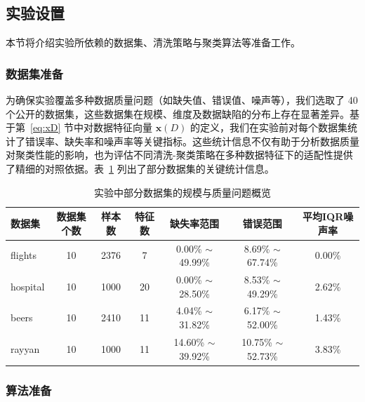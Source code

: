 \documentclass[10pt]{article} %
\numberwithin{equation}{section}
\begin{document}
\subsection{实验设置}
\label{sec:exp_setting}

本节将介绍实验所依赖的数据集、清洗策略与聚类算法等准备工作。

\subsubsection{数据集准备}
\label{sec:dataset_prep}

为确保实验覆盖多种数据质量问题（如缺失值、错误值、噪声等），我们选取了 40 个公开的数据集，这些数据集在规模、维度及数据缺陷的分布上存在显著差异。基于第~\ref{eq:xD} 节中对数据特征向量 $\mathbf{x}(D)$ 的定义，我们在实验前对每个数据集统计了错误率、缺失率和噪声率等关键指标。这些统计信息不仅有助于分析数据质量对聚类性能的影响，也为评估不同清洗-聚类策略在多种数据特征下的适配性提供了精细的对照依据。表~\ref{tab:datasets_info} 列出了部分数据集的关键统计信息。

\begin{table}[htbp]
    \centering
    \small %
    \begin{tabular}{lcccccc}
    \toprule
    \textbf{数据集} & \textbf{数据集个数} & \textbf{样本数} & \textbf{特征数} & \textbf{缺失率范围} & \textbf{错误范围} & \textbf{平均IQR噪声率} \\
    \midrule
    flights  & 10  & 2376   & 7  & 0.00\% $\sim$ 49.99\% & 8.69\% $\sim$ 67.74\%  & 0.00\%  \\
    hospital & 10  & 1000   & 20 & 0.00\% $\sim$ 28.50\% & 8.53\% $\sim$ 49.29\%  & 2.62\%  \\
    beers    & 10  & 2410   & 11 & 4.04\% $\sim$ 31.82\% & 6.17\% $\sim$ 52.00\%  & 1.43\%  \\
    rayyan   & 10  & 1000   & 11 & 14.60\% $\sim$ 39.92\% & 10.75\% $\sim$ 52.73\% & 3.83\%  \\
    \bottomrule
    \end{tabular}
    \caption{实验中部分数据集的规模与质量问题概览}
    \label{tab:datasets_info}
\end{table}

\noindent
\vspace{-20pt} %

\subsubsection{算法准备}
\label{sec:algo_prep}
\end{document}
